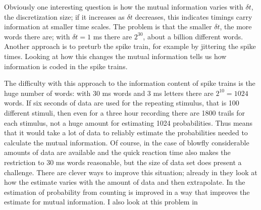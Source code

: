 \documentclass[12pt]{article}
\begin{document}
Obviously one interesting question is how the mutual information
varies with $\delta t$, the discretization size; if it increases as
$\delta t$ decreases, this indicates timings carry information at
smaller time scales. The problem is that the smaller $\delta t$, the
more words there are; with $\delta t=1$ ms there are $2^{30}$, about a
billion different words. Another approach is to preturb the spike
train, for example by jittering the spike times. Looking at how this
changes the mutual information tells us how information is coded in
the spike trains.

The difficulty with this approach to the information content of spike
trains is the huge number of words: with 30 ms words and 3 ms letters
there are $2^{10}=1024$ words. If six seconds of data are used for the
repeating stimulus, that is 100 different stimuli, then even for a
three hour recording there are 1800 trails for each stimulus, not a
huge amount for estimating 1024 probabilities. Thus means that it
would take a lot of data to reliably estimate the probabilities needed
to calculate the mutual information. Of course, in the case of blowfly
considerable amounts of data are available and the quick reaction time
also makes the restriction to 30 ms words reasonable, but the size of
data set does present a challenge. There are clever ways to improve
this situation; already in \cite{StrongEtAl1998} they look at how the
estimate varies with the amount of data and then extrapolate. In
\cite{NemenmanEtAl2004} the estimation of probability from counting is
improved in a way that improves the estimate for mutual information. I
also look at this problem in \cite{Houghton2015,Houghton2018}


{}
\end{document}
